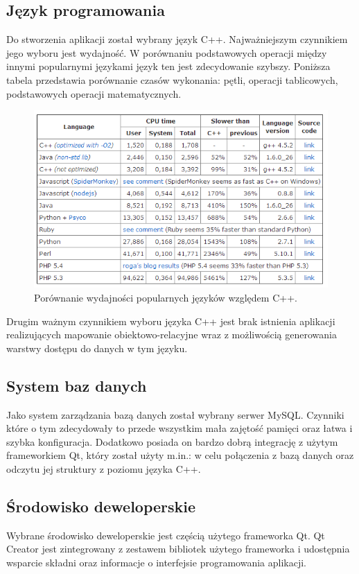 \documentclass[12pt]{report}
\begin{document}
\subsection{Język programowania}
Do stworzenia aplikacji został wybrany język C++. Najważniejszym czynnikiem jego wyboru jest wydajność. W porównaniu podstawowych operacji między innymi popularnymi językami język ten jest zdecydowanie szybszy. Poniższa tabela przedstawia porównanie czasów wykonania: pętli, operacji tablicowych, podstawowych operacji matematycznych.
\begin{figure}[h]
	\centering
	\includegraphics[width=1.1\textwidth]{images/c++test.png}
	\caption{Porównanie wydajności popularnych języków względem C++. \cite{c++testimg}}
\end{figure}
\FloatBarrier

Drugim ważnym czynnikiem wyboru języka C++ jest brak istnienia aplikacji realizujących mapowanie obiektowo-relacyjne wraz z możliwością generowania warstwy dostępu do danych w tym języku.

\subsection{System baz danych}
Jako system zarządzania bazą danych został wybrany serwer MySQL. Czynniki które o tym zdecydowały to przede wszystkim mała zajętość pamięci oraz łatwa i szybka konfiguracja. Dodatkowo posiada on bardzo dobrą integrację z użytym frameworkiem Qt, który został użyty m.in.: w celu połączenia z bazą danych oraz odczytu jej struktury z poziomu języka C++.
\subsection{Środowisko deweloperskie}
Wybrane środowisko deweloperskie jest częścią użytego frameworka Qt. Qt Creator jest zintegrowany z zestawem bibliotek użytego frameworka i udostępnia wsparcie składni oraz informacje o interfejsie programowania aplikacji.
\end{document}
